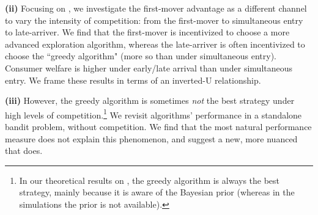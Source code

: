 
\textbf{(ii)} Focusing on \HardMax, we investigate the first-mover advantage as a different channel to vary the intensity of competition: from the first-mover to simultaneous entry to late-arriver. We find that the first-mover is incentivized to choose a more advanced exploration algorithm, whereas the late-arriver is often incentivized to choose the ``greedy algorithm" (more so than under simultaneous entry). Consumer welfare is higher under early/late arrival than under simultaneous entry. We frame these results in terms of an inverted-U relationship.


\textbf{(iii)}
However, the greedy algorithm is sometimes \emph{not} the best strategy under high levels of competition.\footnote{In our theoretical results on \HardMax, the greedy algorithm is always the best strategy, mainly because it is aware of the Bayesian prior (whereas in the simulations  the prior is not available).}
We revisit algorithms' performance in a standalone bandit problem, \ie without competition. We find that the most natural performance measure does not explain this phenomenon, and suggest a new, more nuanced  that does.


